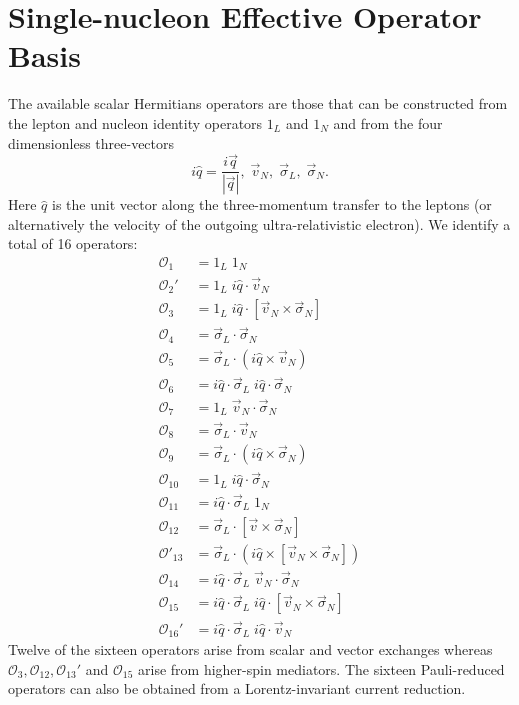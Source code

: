 \documentclass{book}[12pt]
\begin{document}
\section{Single-nucleon Effective Operator Basis}
The available scalar Hermitians operators are those that can be constructed from the lepton and nucleon identity operators $1_L$ and $1_N$ and from the four dimensionless three-vectors
\begin{equation}
i\hat{q}=\frac{i\vec{q}}{|\vec{q}|},\;\vec{v}_N,\;\vec{\sigma}_L,\;\vec{\sigma}_N.
\end{equation}
Here $\hat{q}$ is the unit vector along the three-momentum transfer to the leptons (or alternatively the velocity of the outgoing ultra-relativistic electron). We identify a total of 16 operators:
\begin{equation}
\begin{split}
\mathcal{O}_1&=1_L\;1_N\\
\mathcal{O}_2'&=1_L\;i\hat{q}\cdot\vec{v}_N\\
\mathcal{O}_3&=1_L\;i\hat{q}\cdot\left[\vec{v}_N\times\vec{\sigma}_N\right]\\
\mathcal{O}_4&=\vec{\sigma}_L\cdot\vec{\sigma}_N\\
\mathcal{O}_5&=\vec{\sigma}_L\cdot\left(i\hat{q}\times\vec{v}_N\right)\\
\mathcal{O}_6&=i\hat{q}\cdot\vec{\sigma}_L\;i\hat{q}\cdot\vec{\sigma}_N\\
\mathcal{O}_7&=1_L\;\vec{v}_N\cdot\vec{\sigma}_N\\
\mathcal{O}_8&=\vec{\sigma}_L\cdot\vec{v}_N\\
\mathcal{O}_9&=\vec{\sigma}_L\cdot\left(i\hat{q}\times\vec{\sigma}_N\right)\\
\mathcal{O}_{10}&=1_L\;i\hat{q}\cdot\vec{\sigma}_N\\
\mathcal{O}_{11}&=i\hat{q}\cdot\vec{\sigma}_L\;1_N\\
\mathcal{O}_{12}&=\vec{\sigma}_L\cdot\left[\vec{v}\times\vec{\sigma}_N\right]\\
\mathcal{O}'_{13}&=\vec{\sigma}_L\cdot\left(i\hat{q}\times\left[\vec{v}_N\times\vec{\sigma}_N\right]\right)\\
\mathcal{O}_{14}&=i\hat{q}\cdot\vec{\sigma}_L\;\vec{v}_N\cdot\vec{\sigma}_N\\
\mathcal{O}_{15}&=i\hat{q}\cdot\vec{\sigma}_L\;i\hat{q}\cdot\left[\vec{v}_N\times\vec{\sigma}_N\right]\\
\mathcal{O}_{16}'&=i\hat{q}\cdot\vec{\sigma}_L\;i\hat{q}\cdot\vec{v}_N
\end{split}
\label{eq:basis_NRET}
\end{equation}
Twelve of the sixteen operators arise from scalar and vector exchanges whereas $\mathcal{O}_3,\mathcal{O}_{12},\mathcal{O}_{13}'$ and $\mathcal{O}_{15}$ arise from higher-spin mediators. The sixteen Pauli-reduced operators can also be obtained from a Lorentz-invariant current reduction.
\end{document}
